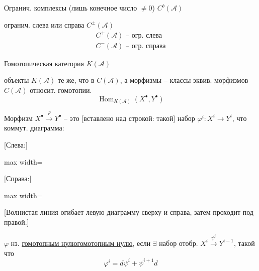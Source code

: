 \documentclass[11pt]{article}
\theoremstyle{definition}
\theoremstyle{remark}
\let\DiplomaticMathUnderline\underline
\renewcommand{\underline}[1]{\ifmmode\DiplomaticMathUnderline{#1}\else\uline{#1}\fi}
\begin{document}
Огранич. комплексы (лишь конечное число $\neq0$) $C^b(\mathcal A)$

огранич. слева или справа $C^{\pm}(\mathcal A)$
\begin{gather*}
C^+(\mathcal A)\text{ -- огр. слева}\\
C^-(\mathcal A)\text{ -- огр. справа}
\end{gather*}

Гомотопическая категория $K(\mathcal A)$

объекты $K(\mathcal A)$ те же, что в $C(\mathcal A)$, а морфизмы -- классы эквив.
морфизмов $C(\mathcal A)$ относит. гомотопии.
\begin{equation*}
\operatorname{Hom}_{K(\mathcal A)}(X^\bullet,Y^\bullet)
\end{equation*}

Морфизм $X^\bullet\overset{\varphi}{\longrightarrow}Y^\bullet$ -- это [вставлено над строкой: такой]
набор $\varphi^i\colon X^i\longrightarrow Y^i$, что коммут. диаграмма:

[Слева:]
\begin{center}
\begin{adjustbox}{max width=\linewidth}
\end{adjustbox}
\end{center}
[Справа:]
\begin{center}
\begin{adjustbox}{max width=\linewidth}
\end{adjustbox}
\end{center}
[Волнистая линия огибает левую диаграмму сверху и справа, затем проходит под правой.]

$\varphi$ нз. \underline{гомотопным нулю}, если $\exists$ набор отобр.
$X^i\overset{\psi^i}{\longrightarrow}Y^{i-1}$,
такой что
\begin{equation*}
\varphi^i=d\psi^i+\psi^{i+1}d\tag{1}
\end{equation*}
\end{document}
